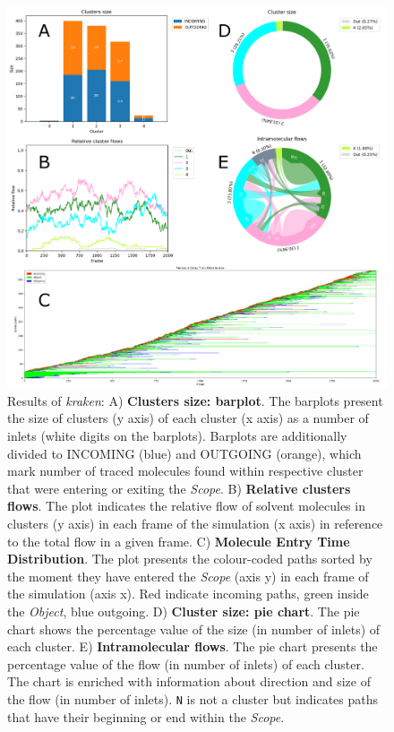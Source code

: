 \documentclass[9pt,tutorial, pubversion]{livecoms}
\begin{document}
\begin{figure}[hptb!]
\centering
\includegraphics[width=\textwidth]{Tut3.1.png}
\caption{Results of \textit{kraken}: A) \textbf{Clusters size: barplot}. The barplots present the size of clusters (y axis) of each cluster (x axis) as a number of inlets (white digits on the barplots). Barplots are additionally divided to INCOMING (blue) and OUTGOING (orange), which mark number of traced molecules found within respective cluster that were entering or exiting the \textit{Scope}. B) \textbf{Relative clusters flows}. The plot indicates the relative flow of solvent molecules in clusters (y axis) in each frame of the simulation (x axis) in reference to the total flow in a given frame. C) \textbf{Molecule Entry Time Distribution}. The plot presents the colour-coded paths sorted by the moment they have entered the \textit{Scope} (axis y) in each frame of the simulation (axis x). Red indicate incoming paths, green inside the \textit{Object}, blue outgoing. D) \textbf{Cluster size: pie chart}. The pie chart shows the percentage value of the size (in number of inlets) of each cluster. E) \textbf{Intramolecular flows}. The pie chart presents the percentage value of the flow (in number of inlets) of  each cluster. The chart is enriched with information about direction and size of the flow (in number of inlets). \texttt{N} is not a cluster but indicates paths that have their beginning or end within the \emph{Scope}.}
\label{Tut3.1}
\end{figure}
\end{document}
